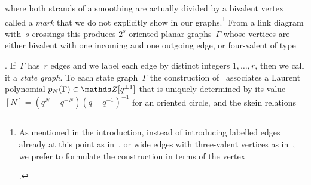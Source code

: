 \documentclass{compositio}
\theoremstyle{definition}
\numberwithin{equation}{section}
\begin{document}
where both strands of a smoothing are actually divided by a bivalent vertex called a \emph{mark} that we do not explicitly show in our graphs.\footnote{As mentioned in the introduction, instead of introducing labelled edges already at this point as in~\cite{moy1998}, or wide edges with three-valent vertices as in~\cite{kr0401268}, we prefer to formulate the construction in terms of the vertex  \begin{minipage}{0.38cm}
\end{minipage}.} 
From a link diagram with~$s$ crossings this produces $2^s$ oriented planar graphs~$\Gamma$ whose vertices are either bivalent with one incoming and one outgoing edge, or four-valent of type 
 \begin{minipage}{0.48cm}
\end{minipage}. If~$\Gamma$ has~$r$ edges and we label each edge by distinct integers $1,\ldots,r$, then we call it a \emph{state graph}. To each state graph~$\Gamma$ the construction of~\cite{moy1998} associates a Laurent polynomial $p_{N}(\Gamma)\in\nZ[q^{\pm 1}]$ that is uniquely determined by its value $[N]=(q^N-q^{-N})(q-q^{-1})^{-1}$ for an oriented circle, and the skein relations
\end{document}
